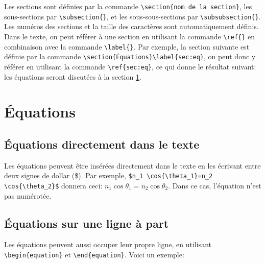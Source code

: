 \documentclass[10pt,letterpaper,twocolumn]{article}
\begin{document}
Les sections sont définies par la commande \verb|\section{nom de la section}|, les sous-sections par \verb|\subsection{}|, et les sous-sous-sections par \verb|\subsubsection{}|. Les numéros des sections et la taille des caractères sont automatiquement définis. Dans le texte, on peut référer à une section en utilisant la commande \verb|\ref{}| en combinaison avec la commande \verb|\label{}|. Par exemple, la section suivante est définie par la commande \verb|\section{Équations}\label{sec:eq}|, on peut donc y référer en utilisant la commande \verb|\ref{sec:eq}|, ce qui donne le résultat suivant: les équations seront discutées à la section \ref{sec:eq}.

\section{Équations}\label{sec:eq}

\subsection{Équations directement dans le texte}

Les équations peuvent être insérées directement dans le texte en les écrivant entre deux signes de dollar (\$). Par exemple,  \verb|$n_1 \cos{\theta_1}=n_2 \cos{\theta_2}$| donnera ceci: $n_1 \cos{\theta_1}=n_2 \cos{\theta_2}$. Dans ce cas, l'équation n'est pas numérotée.

\subsection{Équations sur une ligne à part}

Les équations peuvent aussi occuper leur propre ligne, en utilisant \verb|\begin{equation}| et \verb|\end{equation}|. Voici un exemple:
\end{document}
